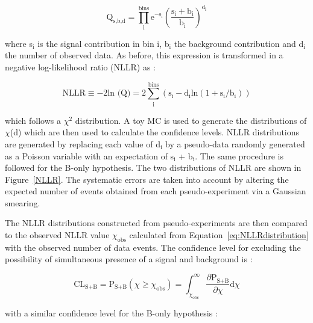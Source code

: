 \documentclass[main.tex]{subfiles}
\begin{document}
\begin{equation}
\text{Q}_{\text{s,b,d}} = \prod^{\text{bins}}_\text{i}  \text{e}^{-\text{s}_\text{i}} \left( \frac{\text{s}_\text{i} + \text{b}_\text{i}}{\text{b}_\text{i}} \right)^{\text{d}_\text{i}}
\end{equation}

\bigskip


\NI where s$_\text{i}$ is the signal contribution in bin i, b$_\text{i}$ the background contribution and d$_\text{i}$ the number of observed data. As before, this expression is transformed in a negative log-likelihood ratio (NLLR) as :


\begin{equation}\label{eq:NLLRdistribution}
\text{NLLR} \equiv -\text{2} \text{ln (Q)} = \text{2} \sum _\text{i}^{\text{bins}} (\text{s}_\text{i}  - \text{d}_\text{i} \text{ln} (1 + \text{s}_\text{i}/\text{b}_\text{i}))
\end{equation}


\bigskip


\NI which follows a $\chi^\text{2}$ distribution. A toy MC is used to generate the distributions of $\chi$(d) which are then used to calculate the confidence levels. NLLR distributions are generated by replacing each value of d$_\text{i}$ by a pseudo-data randomly generated as a Poisson variable with an expectation of s$_\text{i}$ + b$_\text{i}$. The same procedure is followed for the B-only hypothesis. The two distributions of NLLR are shown in Figure~\ref{NLLR}. The systematic errors are taken into account by altering the expected number of events obtained from each pseudo-experiment via a Gaussian smearing.


\bigskip


\NI The NLLR distributions constructed from pseudo-experiments are then compared to the observed NLLR value $\chi_{\text{obs}}$ calculated from Equation~\ref{eq:NLLRdistribution} with the observed number of data events. The confidence level for excluding the possibility  of simultaneous presence of a signal and background is : 


\begin{equation}
\text{CL}_{\text{S+B}} = \text{P}_{\text{S+B}} (\chi \geq \chi_{\text{obs}} ) = \int_{\chi_{\text{obs}}}^{\infty} \frac{\partial \text{P}_{\text{S+B}} }{\partial \chi} 	\text{d}\chi 
\end{equation}


\bigskip


\NI with a similar confidence level for the B-only hypothesis : 
\end{document}
